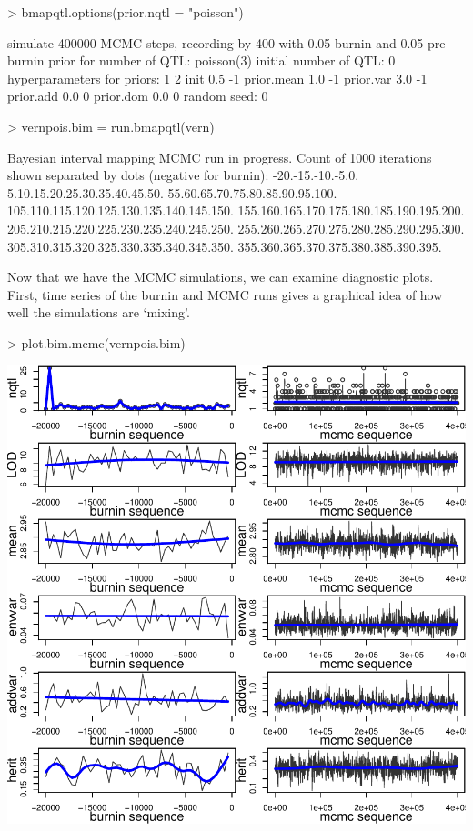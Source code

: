 \documentclass{article}
\begin{document}
\begin{Schunk}
\begin{Sinput}
> bmapqtl.options(prior.nqtl = "poisson")
\end{Sinput}
\begin{Soutput}
simulate 400000 MCMC steps, recording by 400 with 0.05 burnin and 0.05 pre-burnin
prior for number of QTL: poisson(3)
initial number of QTL: 0 
hyperparameters for priors:
             1  2
init       0.5 -1
prior.mean 1.0 -1
prior.var  3.0 -1
prior.add  0.0  0
prior.dom  0.0  0
random seed: 0 
\end{Soutput}
\end{Schunk}

\begin{Schunk}
\begin{Sinput}
> vernpois.bim = run.bmapqtl(vern)
\end{Sinput}
\begin{Soutput}
Bayesian interval mapping MCMC run in progress. 
Count of 1000 iterations shown separated by dots (negative for burnin):
-20.-15.-10.-5.0.
5.10.15.20.25.30.35.40.45.50.
55.60.65.70.75.80.85.90.95.100.
105.110.115.120.125.130.135.140.145.150.
155.160.165.170.175.180.185.190.195.200.
205.210.215.220.225.230.235.240.245.250.
255.260.265.270.275.280.285.290.295.300.
305.310.315.320.325.330.335.340.345.350.
355.360.365.370.375.380.385.390.395.
\end{Soutput}
\end{Schunk}

Now that we have the MCMC simulations, we can examine diagnostic
plots. First, time series of the burnin and MCMC runs gives a
graphical idea of how well the simulations are `mixing'.
 
\begin{Schunk}
\begin{Sinput}
> plot.bim.mcmc(vernpois.bim)
\end{Sinput}
\end{Schunk}
\includegraphics{bim_summary-005}
\end{document}
